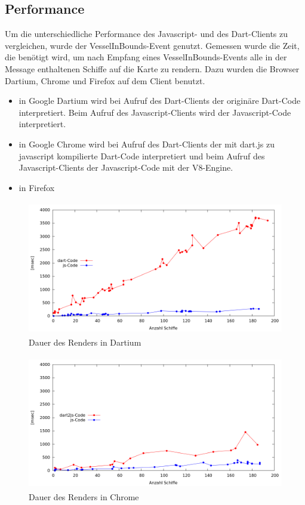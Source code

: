 \subsection{Performance}
Um die unterschiedliche Performance des Javascript- und des Dart-Clients zu vergleichen, wurde der VesselInBounds-Event genutzt. Gemessen wurde die Zeit, die benötigt wird, um nach Empfang eines VesselInBounds-Events alle in der Message enthaltenen Schiffe auf die Karte zu rendern. Dazu wurden die Browser Dartium, Chrome und Firefox auf dem Client benutzt.
\begin{itemize}
\item in Google Dartium wird bei Aufruf des Dart-Clients der originäre Dart-Code interpretiert. Beim Aufruf des Javascript-Clients wird der Javascript-Code interpretiert.
\item in Google Chrome wird bei Aufruf des Dart-Clients der mit dart.js zu javascript kompilierte Dart-Code interpretiert und beim Aufruf des Javascript-Clients der Javascript-Code mit der V8-Engine.
\item in Firefox
\end {itemize}
\newpage

\begin {figure}[H]
\begin{center}
  \includegraphics[height=2.3in]{images/Dartium.png}
\end{center}
 \caption{Dauer des Renders in Dartium}
\end {figure}


\begin {figure}[H]
\begin{center}
  \includegraphics[height=2.3in]{images/Chrome.png}
\end{center}
 \caption{Dauer des Renders in Chrome}
\end {figure}


